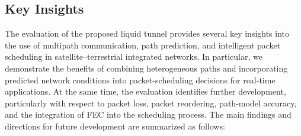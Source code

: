 \documentclass[sigconf,nonacm]{acmart}
\begin{document}

\subsection{Key Insights}
The evaluation of the proposed liquid tunnel provides several key insights into the use of multipath communication, path prediction, and intelligent packet scheduling in satellite--terrestrial integrated networks. In particular, we demonstrate the benefits of combining heterogeneous paths and incorporating predicted network conditions into packet-scheduling decisions for real-time applications. At the same time, the evaluation identifies further development, particularly with respect to packet loss, packet reordering, path-model accuracy, and the integration of FEC into the scheduling process. The main findings and directions for future development are summarized as follows:
\end{document}

